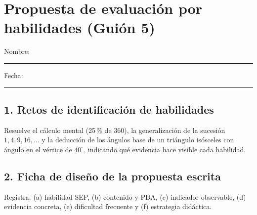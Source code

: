 \documentclass[spanish,letterpaper,oneside]{article}
\begin{document}
\templatePortrait\templatePagecfg\templateFinalcfg\fancyfoot{}\fancyfoot[C]{\scriptsize\thepage}\raggedbottom

\section*{Propuesta de evaluación por habilidades (Guión 5)}
Nombre: \rule{8cm}{.2pt}\hfill Fecha: \rule{2.5cm}{.2pt}

\subsection*{1. Retos de identificación de habilidades}
Resuelve el cálculo mental (25\,\% de $360$), la generalización de la sucesión $1, 4, 9, 16,\dots$ y la deducción de los ángulos base de un triángulo isósceles con ángulo en el vértice de $40^\circ$, indicando qué evidencia hace visible cada habilidad.
\vspace{2.2cm}

\subsection*{2. Ficha de diseño de la propuesta escrita}
Registra: (a) habilidad SEP, (b) contenido y PDA, (c) indicador observable, (d) evidencia concreta, (e) dificultad frecuente y (f) estrategia didáctica.
\vspace{2.5cm}
\end{document}
